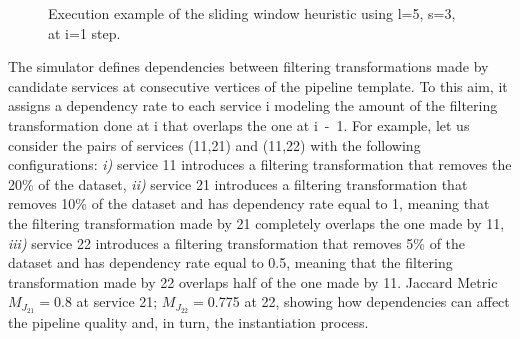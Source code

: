 \begin{figure}[!t]
{
      }
      \caption{Execution example of the sliding window heuristic using l=5, s=3,  at i=1 step.}
      \label{fig:execution_example}
    \end{figure}

    The simulator defines dependencies between filtering transformations made by candidate services at consecutive vertices of the pipeline template.
    To this aim, it assigns a dependency rate to each service \si{i} modeling the amount of the filtering transformation done at \si{i} that overlaps the one at \si{i-1}.
    For example, let us consider the pairs of services (\si{11},\si{21}) and (\si{11},\si{22}) with the following configurations: \emph{i)} service \si{11} introduces a filtering transformation that removes the 20\% of the dataset, \emph{ii)} service \si{21} introduces a filtering transformation that removes 10\% of the dataset and has dependency rate equal to 1, meaning that the filtering transformation made by \si{21} completely overlaps the one made by \si{11}, \emph{iii)} service \si{22} introduces a filtering transformation that removes 5\% of the dataset and has dependency rate equal to 0.5, meaning that the filtering transformation made by \si{22} overlaps half of the one made by \si{11}. Jaccard Metric $M_{J_{21}}$$=$0.8 at service \si{21}; $M_{J_{22}}$$=$0.775 at \si{22}, showing how dependencies can affect the pipeline quality and, in turn, the instantiation process.


